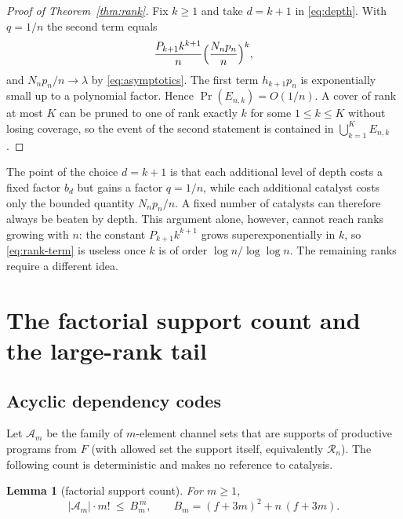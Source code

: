 \documentclass[11pt,a4paper]{article}
\theoremstyle{plain}
\newtheorem{lemma}[theorem]{Lemma}
\theoremstyle{definition}
\theoremstyle{remark}
\newcommand{\cA}{\mathcal A}
\newcommand{\cR}{\mathcal R}
\begin{document}
\begin{proof}[Proof of Theorem~\ref{thm:rank}]
Fix $k\ge1$ and take $d=k+1$ in \eqref{eq:depth}. With $q=1/n$ the second term equals
\begin{equation}\label{eq:rank-term}
\frac{P_{k+1}k^{k+1}}{n}\Bigl(\frac{N_np_n}{n}\Bigr)^{k},
\end{equation}
and $N_np_n/n\to\lambda$ by \eqref{eq:asymptotics}. The first term $h_{k+1}p_n$ is exponentially small up to a polynomial factor. Hence $\Pr(E_{n,k})=O(1/n)$. A cover of rank at most $K$ can be pruned to one of rank exactly $k$ for some $1\le k\le K$ without losing coverage, so the event of the second statement is contained in $\bigcup_{k=1}^KE_{n,k}$.
\end{proof}

The point of the choice $d=k+1$ is that each additional level of depth costs a fixed factor $b_d$ but gains a factor $q=1/n$, while each additional catalyst costs only the bounded quantity $N_np_n/n$. A fixed number of catalysts can therefore always be beaten by depth. This argument alone, however, cannot reach ranks growing with $n$: the constant $P_{k+1}k^{k+1}$ grows superexponentially in $k$, so \eqref{eq:rank-term} is useless once $k$ is of order $\log n/\log\log n$. The remaining ranks require a different idea.

\section{The factorial support count and the large-rank tail}\label{sec:large}

\subsection{Acyclic dependency codes}

Let $\cA_m$ be the family of $m$-element channel sets that are supports of productive programs from $F$ (with allowed set the support itself, equivalently $\cR_n$). The following count is deterministic and makes no reference to catalysis.

\begin{lemma}[factorial support count]\label{lem:factorial}
For $m\ge1$,
\begin{equation}\label{eq:factorial}
|\cA_m|\cdot m!\ \le\ B_m^{\,m},\qquad B_m=(f+3m)^2+n\,(f+3m).
\end{equation}
\end{lemma}
\end{document}
